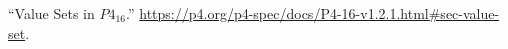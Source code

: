 \documentclass[11pt]{article}
\begin{document}
{{\begin{thebibliography}{40}
\mdbibitemlabel{{}[40]}\textquotedblleft{}Value Sets in $P4_{16}$.\textquotedblright{} \href{https://p4.org/p4-spec/docs/P4-16-v1.2.1.html\%23sec-value-set}{{\ttfamily https://\hspace{0pt}p4.\hspace{0pt}org/\hspace{0pt}p4-\hspace{0pt}spec/\hspace{0pt}docs/\hspace{0pt}P4-\hspace{0pt}16-\hspace{0pt}v1.\hspace{0pt}2.\hspace{0pt}1.\hspace{0pt}html\#\hspace{0pt}sec-\hspace{0pt}value-\hspace{0pt}set}}.\label{p4valuesets}%
\par%
\end{thebibliography}}%
}%
\end{document}
